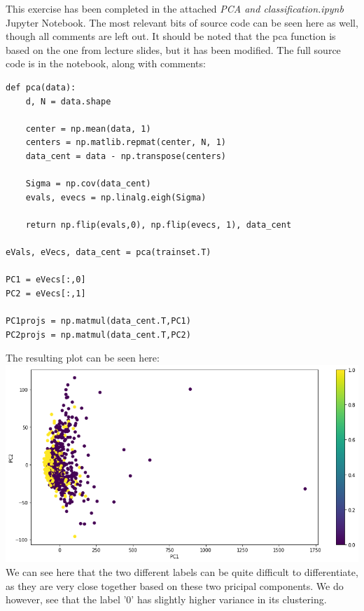 This exercise has been completed in the attached \textit{PCA and classification.ipynb} Jupyter Notebook. The most relevant bits of source code can be seen here as well, though all comments are left out. It should be noted that the pca function is based on the one from lecture slides, but it has been modified. The full source code is in the notebook, along with comments:
\begin{verbatim}
def pca(data):
    d, N = data.shape

    center = np.mean(data, 1)
    centers = np.matlib.repmat(center, N, 1)
    data_cent = data - np.transpose(centers)
    
    Sigma = np.cov(data_cent)
    evals, evecs = np.linalg.eigh(Sigma)
    
    return np.flip(evals,0), np.flip(evecs, 1), data_cent

eVals, eVecs, data_cent = pca(trainset.T)

PC1 = eVecs[:,0]
PC2 = eVecs[:,1]

PC1projs = np.matmul(data_cent.T,PC1)
PC2projs = np.matmul(data_cent.T,PC2)
\end{verbatim}
The resulting plot can be seen here:\\
\includegraphics[width=\linewidth]{5a1.png}
We can see here that the two different labels can be quite difficult to differentiate, as they are very close together based on these two pricipal components. We do however, see that the label '0' has slightly higher variance in its clustering.